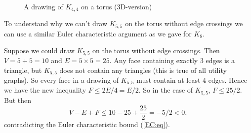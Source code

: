 \documentclass[12pt]{article}
\begin{document}
\begin{figure}[h!]
    \begin{center}

            \end{center}
\caption{A drawing of $K_{4,4}$ on a torus (3D-version)}\label{K44:3d}
        \end{figure}

To understand why we can't draw $K_{5,5}$ on the torus without edge crossings we can use a similar Euler characteristic argument as we gave for $K_8$. 

Suppose we could draw $K_{5,5}$ on the torus without edge crossings. Then $V = 5 + 5 = 10$ and $E = 5 \times 5 = 25$. Any face containing exactly 3 edges is a triangle, but $K_{5,5}$ does not contain any triangles (this is true of all utility graphs). So every face in a drawing of $K_{5,5}$ must contain at least 4 edges. Hence we have
the new inequality $F \le 2E/4 = E/2$. So in the case of $K_{5,5}$, $F \le 25/2$. But then
\[
V- E + F \le 10 - 25 + \frac{25}{2} = -5/2 <0,
\] contradicting the Euler characteristic bound (\ref{EC:eq}).
\fi
\end{document}
